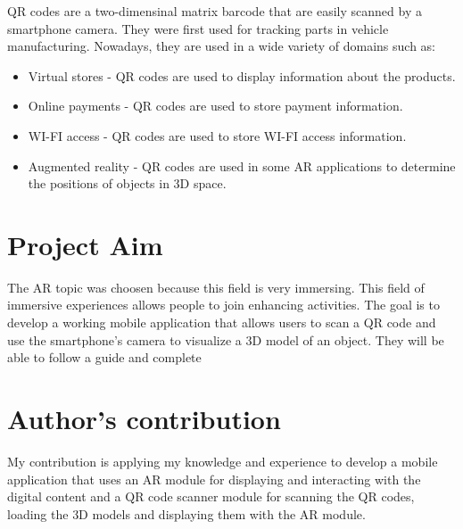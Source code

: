 \ac{QR} codes are a two-dimensinal matrix barcode that are easily scanned by a smartphone camera. They were first used for tracking parts in vehicle manufacturing. Nowadays, they are used in a wide variety of domains such as:
\begin{itemize}
    \item Virtual stores - \ac{QR} codes are used to display information about the products.
    \item Online payments - \ac{QR} codes are used to store payment information.
    \item WI-FI access - \ac{QR} codes are used to store WI-FI access information.
    \item Augmented reality - \ac{QR} codes are used in some \ac{AR} applications to determine the positions of objects in \ac{3D} space.
\end{itemize}


\section{Project Aim}
The \ac{AR} topic was choosen because this field is very immersing. This field of immersive experiences allows people to join enhancing activities.
The goal is to develop a working mobile application that allows users to scan a \ac{QR} code and use the smartphone's camera to visualize a \ac{3D} model of an object. They will be able to follow a guide and complete

\section{Author's contribution}
My contribution is applying my knowledge and experience to develop a mobile application that uses an \ac{AR} module for displaying and interacting with the digital content and a \ac{QR} code scanner module for scanning the \ac{QR} codes, loading the \ac{3D} models and displaying them with the \ac{AR} module.





